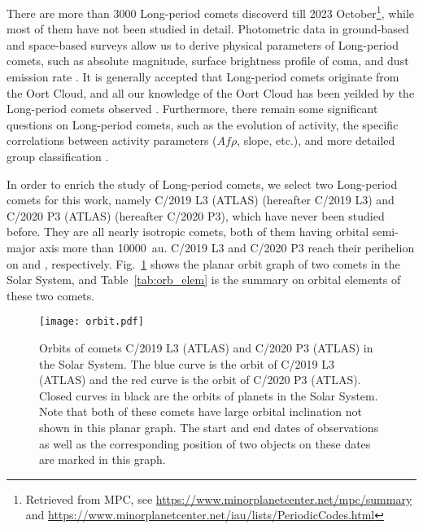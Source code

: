 There are more than \num{3000} Long-period comets discoverd till 2023 October\footnote{Retrieved from MPC, see \url{https://www.minorplanetcenter.net/mpc/summary} and \url{https://www.minorplanetcenter.net/iau/lists/PeriodicCodes.html}}, while most of them have not been studied in detail. Photometric data in ground-based and space-based surveys allow us to derive physical parameters of Long-period comets, such as absolute magnitude, surface brightness profile of coma, and dust emission rate \citep{bauer_comet_2022, betzler_activity_2023}. It is generally accepted that Long-period comets originate from the Oort Cloud, and all our knowledge of the Oort Cloud has been yeilded by the Long-period comets observed \citep{fouchard_what_2023}. Furthermore, there remain some significant questions on Long-period comets, such as the evolution of activity, the specific correlations between activity parameters ($Af\rho$, slope, etc.), and more detailed group classification \citep{sarneczky_activity_2016}. 

In order to enrich the study of Long-period comets, we select two Long-period comets for this work, namely C/2019 L3 (ATLAS) (hereafter C/2019 L3) and C/2020 P3 (ATLAS) (hereafter C/2020 P3), which have never been studied before. They are all nearly isotropic comets, both of them having orbital semi-major axis more than {\qty{10000}{\astronomicalunit}}. C/2019 L3 and C/2020 P3 reach their perihelion on  and , respectively. Fig.~\ref{fig:orbit} shows the planar orbit graph of two comets in the Solar System, and Table~\ref{tab:orb_elem} is the summary on orbital elements of these two comets. 

\begin{figure}
    \centering
    \texttt{[image: orbit.pdf]}
    \caption{Orbits of comets C/2019 L3 (ATLAS) and C/2020 P3 (ATLAS) in the Solar System. The blue curve is the orbit of C/2019 L3 (ATLAS) and the red curve is the orbit of C/2020 P3 (ATLAS). Closed curves in black are the orbits of planets in the Solar System. Note that both of these comets have large orbital inclination not shown in this planar graph. The start and end dates of observations as well as the corresponding position of two objects on these dates are marked in this graph. }
    \label{fig:orbit}
\end{figure}

